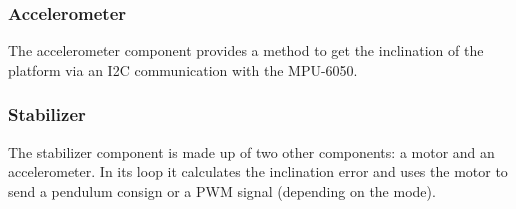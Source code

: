 \subsubsection{Accelerometer}
The accelerometer component provides a method to get the inclination of the platform via an I2C communication with
the MPU-6050.
\subsubsection{Stabilizer}
The stabilizer component is made up of two other components: a motor and an accelerometer. In its loop it calculates
the inclination error and uses the motor to send a pendulum consign or a PWM signal (depending on the mode).